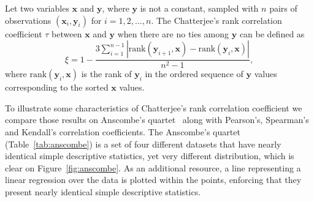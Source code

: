\begin{definition}\label{def:chatterjee}
Let two variables $\mathbf{x}$ and $\mathbf{y}$, where $\mathbf{y}$ is not a constant, sampled with $n$ pairs of observations $(\mathbf{x}_i, \mathbf{y}_i)$ for $i = 1, 2, \ldots, n$. The Chatterjee's rank correlation coefficient $\tau$ between $\mathbf{x}$ and $\mathbf{y}$ when there are no ties among $\mathbf{y}$ can be defined as 
\begin{equation}\label{eq:chatterjee}
\xi = 1 - \frac{3 \sum\limits_{i=1}^{n-1} | \mathrm{rank}(\mathbf{y}_{i+1},\mathbf{x}) - \mathrm{rank}(\mathbf{y}_i,\mathbf{x})|}{n^2 - 1},
\end{equation}
where $\mathrm{rank}(\mathbf{y}_i,\mathbf{x})$ is the rank of $\mathbf{y}_i$ in the ordered sequence of $\mathbf{y}$ values corresponding to the sorted $\mathbf{x}$ values. 
\end{definition}

To illustrate some characteristics of Chatterjee's rank correlation coefficient we compare those results on Anscombe's quartet~\citep{anscombe1973} along with Pearson's, Spearman's and Kendall's correlation coefficients. The Anscombe's quartet (Table~\ref{tab:anscombe}) is a set of four different datasets that have nearly identical simple descriptive statistics, yet very different distribution, which is clear on Figure~\ref{fig:anscombe}. As an additional resource, a line representing a linear regression over the data is plotted within the points, enforcing that they present nearly identical simple descriptive statistics.


